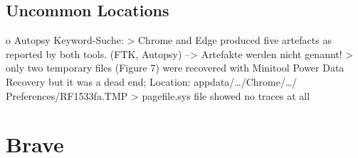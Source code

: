 \subsection*{Uncommon Locations}

o Autopsy Keyword-Suche: 
	> Chrome and Edge produced five artefacts as reported by both tools. (FTK, Autopsy) \cite{Gabet.2018}
		--> Artefakte werden nicht genannt!
	> only two temporary files (Figure 7) were recovered with Minitool Power Data Recovery but it was a dead end; Location: appdata/…/Chrome/…/ Preferences/RF1533fa.TMP \cite{Fayyad.2021}
	> pagefile.sys file showed no traces at all \cite{Said.2011}
	

\section{Brave}